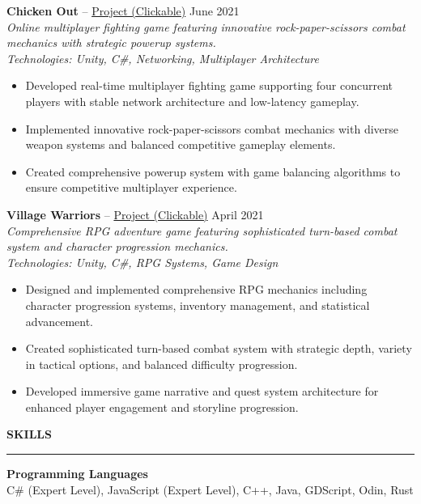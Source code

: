 \documentclass[a4paper,10pt]{article}
\newcommand{\sectionheading}[1]{%
  \addvspace{\medskipamount}%
  {\large\bfseries\MakeUppercase{#1}} %
  \noindent\rule{\linewidth}{0.4pt}%
  \vspace{\smallskipamount}%
}
\begin{document}
\textbf{Chicken Out} -- \href{https://assayyaad.itch.io/chicken-out}{Project (Clickable)} \hfill June 2021\\
\textit{Online multiplayer fighting game featuring innovative rock-paper-scissors combat mechanics with strategic powerup systems.}\\
\textit{Technologies: Unity, C\#, Networking, Multiplayer Architecture}
\begin{itemize}[nosep]
    \item Developed real-time multiplayer fighting game supporting four concurrent players with stable network architecture and low-latency gameplay.
    \item Implemented innovative rock-paper-scissors combat mechanics with diverse weapon systems and balanced competitive gameplay elements.
    \item Created comprehensive powerup system with game balancing algorithms to ensure competitive multiplayer experience.
\end{itemize}

\addvspace{\medskipamount}

\textbf{Village Warriors} -- \href{https://assayyaad.itch.io/village-warriors}{Project (Clickable)} \hfill April 2021\\
\textit{Comprehensive RPG adventure game featuring sophisticated turn-based combat system and character progression mechanics.}\\
\textit{Technologies: Unity, C\#, RPG Systems, Game Design}
\begin{itemize}[nosep]
    \item Designed and implemented comprehensive RPG mechanics including character progression systems, inventory management, and statistical advancement.
    \item Created sophisticated turn-based combat system with strategic depth, variety in tactical options, and balanced difficulty progression.
    \item Developed immersive game narrative and quest system architecture for enhanced player engagement and storyline progression.
\end{itemize}

\sectionheading{Skills}

\textbf{Programming Languages}\\
C\# (Expert Level), JavaScript (Expert Level), C++, Java, GDScript, Odin, Rust

\addvspace{\smallskipamount}
\end{document}
